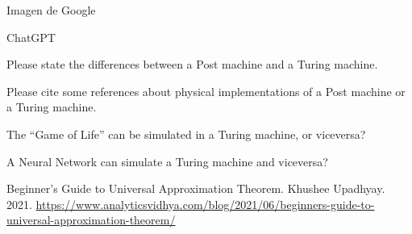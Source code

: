 \documentclass[10pd,hyperref={colorlinks=true}]{beamer}
\begin{document}

\begin{frame}

 \vfill
 \centerline{}

 \vfill

\end{frame}


\begin{frame}

 \vfill
 \centerline{}

 \centerline{\tiny Imagen de Google}
 \vfill

\end{frame}


\begin{frame}

\vfill

ChatGPT

\vfill

Please state the differences between a Post machine and a Turing 
machine.

\vfill

Please cite some references about physical implementations of a Post 
machine or a Turing machine.

\vfill

The ``Game of Life'' can be simulated in a Turing machine, or viceversa?

\vfill

A Neural Network can simulate a Turing machine and viceversa?

\vfill

Beginner’s Guide to Universal Approximation Theorem. Khushee 
Upadhyay. 2021. 
\url{https://www.analyticsvidhya.com/blog/2021/06/beginners-guide-to-universal-approximation-theorem/}

\vfill

\end{frame}

\end{document}
